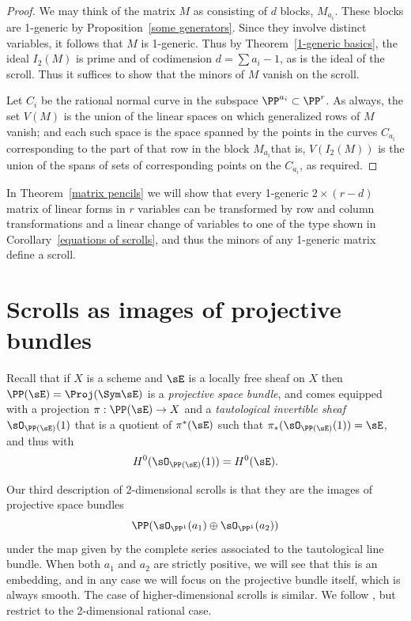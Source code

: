 \begin{proof} We may think of the matrix $M$ as consisting of $d$
blocks, $M_{a_{i}}$. These blocks are 1-generic by Proposition~\ref{some
generators}. Since they involve distinct variables, it follows that $M$
is 1-generic. Thus by
Theorem~\ref{1-generic basics}, the ideal $I_{2}(M)$ is prime and of
codimension $d = \sum a_{i}-1$, as is the ideal of the scroll. Thus it
suffices to show that the minors of $M$ vanish on the scroll.

Let $C_{i}$ be the rational normal curve in the subspace
$\PP^{a_{i}}\subset\PP^{r}$.
As always, the set $V(M)$ is the union of the linear spaces on which
generalized rows of $M$ vanish; and each such space is the space spanned
by the points in the curves $C_{a_{i}}$ corresponding to the part of that
row in the block $M_{a_{i}}$\emdash that is, $V(I_{2}(M))$ is the union of
the spans of sets of corresponding points on the $C_{a_{i}}$, as required.
\end{proof}

In Theorem~\ref{matrix pencils} we will show that every
1-generic $2 \times (r-d)$ matrix of linear forms in $r$ variables can
be transformed by row and column transformations and a linear change
of variables to one of the type shown in
Corollary~\ref{equations of scrolls}, and thus the minors of any 1-generic
matrix define a scroll.

\section{Scrolls as images of projective bundles}\label{inscrutable name}

Recall that if $X$ is a scheme and $\sE$ is a locally free sheaf on
$X$ then $\PP(\sE) = \Proj(\Sym \sE)$ is a 
\emph{projective space bundle}, 
%
%
and comes equipped with a projection $\pi: \PP(\sE) \to X$
and a \emph{tautological invertible sheaf} $\sO_{\PP(\sE)}(1)$ that is
%
a quotient of $\pi^{*}(\sE)$ such that $\pi_{*}(\sO_{\PP(\sE)}(1)) =
\sE$, and thus with
$$
H^{0}(\sO_{\PP(\sE)}(1)) = H^{0}(\sE).
$$

Our third description of 2-dimensional scrolls is that they are the
images of projective space bundles
$$
\PP(\sO_{\PP^{1}}(a_{1})\oplus \sO_{\PP^{1}}(a_{2}))
$$
under the map given by the complete series associated to the 
tautological line bundle.
%
When both $a_{1}$ and $a_{2}$ are strictly positive,
we will see that this is an embedding, and in any case we will focus
on the projective bundle itself, which is always smooth. The case
of higher-dimensional scrolls is similar. We follow  
\cite[Chapter V]{Hartshorne1977}, but restrict
to the 2-dimensional rational case.

